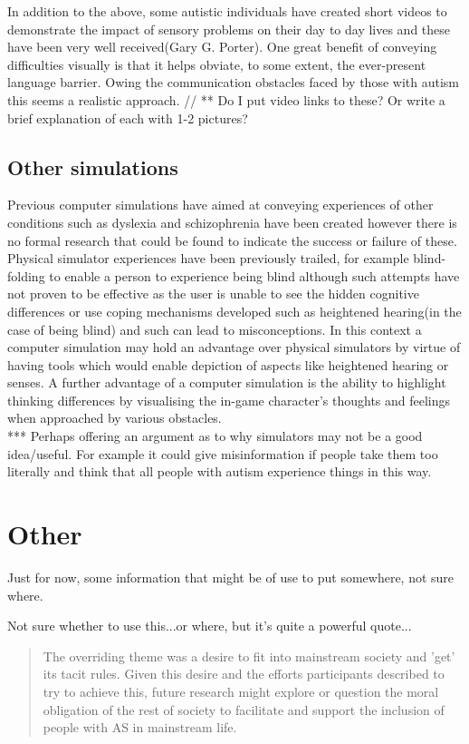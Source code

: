 \documentclass[11pt]{report}
\begin{document}
In addition to the above, some autistic individuals have created short videos to demonstrate the impact of sensory problems on their day to day lives and these have been very well received(Gary G. Porter). One great benefit of conveying difficulties visually is that it helps obviate, to some extent, the ever-present language barrier. Owing the communication obstacles faced by those with autism this seems a realistic approach. // ** Do I put video links to these? Or write a brief explanation of each with 1-2 pictures?

\subsection{Other simulations}
Previous computer simulations have aimed at conveying experiences of other conditions such as dyslexia and schizophrenia have been created however there is no formal research that could be found to indicate the success or failure of these. 
Physical simulator experiences have been previously trailed, for example blind-folding to enable a person to experience being blind although such attempts have not proven to be effective\cite{dd} as the user is unable to see the hidden cognitive differences or use coping mechanisms developed such as heightened hearing(in the case of being blind) and such can lead to misconceptions. In this context a computer simulation may hold an advantage over physical simulators by virtue of having tools which would enable depiction of aspects like heightened hearing or senses. A further advantage of a computer simulation is the ability to highlight thinking differences by visualising the in-game character's thoughts and feelings when approached by various obstacles. \\

*** Perhaps offering an argument as to why simulators may not be a good idea/useful. For example it could give misinformation if people take them too literally and think that all people with autism experience things in this way.

\section{Other}
Just for now, some information that might be of use to put somewhere, not sure where.

Not sure whether to use this...or where, but it's quite a powerful quote...
\begin{quote}
The overriding theme was a desire to fit into mainstream society and 'get' its tacit rules. Given this desire and the
efforts participants described to try to achieve this, future research might explore or question the moral obligation of the rest of society to facilitate and support the inclusion of people with AS in mainstream life. \cite{aspieway}
\end{quote}
\end{document}

